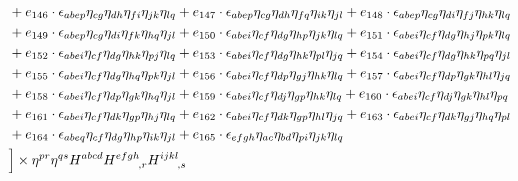 \begin{itemize}
{\begin{minipage}[t]{\linewidth}
\begin{align}
    & + e_{146} \cdot \epsilon_{a b e p} \eta_{c g} \eta_{d h} \eta_{f i} \eta_{j k} \eta_{l q} + e_{147} \cdot \epsilon_{a b e p} \eta_{c g} \eta_{d h} \eta_{f q} \eta_{i k} \eta_{j l} + e_{148} \cdot \epsilon_{a b e p} \eta_{c g} \eta_{d i} \eta_{f j} \eta_{h k} \eta_{l q} \nonumber \\
    & + e_{149} \cdot \epsilon_{a b e p} \eta_{c g} \eta_{d i} \eta_{f k} \eta_{h q} \eta_{j l} + e_{150} \cdot \epsilon_{a b e i} \eta_{c f} \eta_{d g} \eta_{h p} \eta_{j k} \eta_{l q} + e_{151} \cdot \epsilon_{a b e i} \eta_{c f} \eta_{d g} \eta_{h j} \eta_{p k} \eta_{l q} \nonumber \\
    & + e_{152} \cdot \epsilon_{a b e i} \eta_{c f} \eta_{d g} \eta_{h k} \eta_{p j} \eta_{l q} + e_{153} \cdot \epsilon_{a b e i} \eta_{c f} \eta_{d g} \eta_{h k} \eta_{p l} \eta_{j q} + e_{154} \cdot \epsilon_{a b e i} \eta_{c f} \eta_{d g} \eta_{h k} \eta_{p q} \eta_{j l} \nonumber \\
    & + e_{155} \cdot \epsilon_{a b e i} \eta_{c f} \eta_{d g} \eta_{h q} \eta_{p k} \eta_{j l} + e_{156} \cdot \epsilon_{a b e i} \eta_{c f} \eta_{d p} \eta_{g j} \eta_{h k} \eta_{l q} + e_{157} \cdot \epsilon_{a b e i} \eta_{c f} \eta_{d p} \eta_{g k} \eta_{h l} \eta_{j q} \nonumber \\
    & + e_{158} \cdot \epsilon_{a b e i} \eta_{c f} \eta_{d p} \eta_{g k} \eta_{h q} \eta_{j l} + e_{159} \cdot \epsilon_{a b e i} \eta_{c f} \eta_{d j} \eta_{g p} \eta_{h k} \eta_{l q} + e_{160} \cdot \epsilon_{a b e i} \eta_{c f} \eta_{d j} \eta_{g k} \eta_{h l} \eta_{p q} \nonumber \\
    & + e_{161} \cdot \epsilon_{a b e i} \eta_{c f} \eta_{d k} \eta_{g p} \eta_{h j} \eta_{l q} + e_{162} \cdot \epsilon_{a b e i} \eta_{c f} \eta_{d k} \eta_{g p} \eta_{h l} \eta_{j q} + e_{163} \cdot \epsilon_{a b e i} \eta_{c f} \eta_{d k} \eta_{g j} \eta_{h q} \eta_{p l} \nonumber \\
    & + e_{164} \cdot \epsilon_{a b e q} \eta_{c f} \eta_{d g} \eta_{h p} \eta_{i k} \eta_{j l} + e_{165} \cdot \epsilon_{e f g h} \eta_{a c} \eta_{b d} \eta_{p i} \eta_{j k} \eta_{l q} \nonumber \\
    & \Big\rbrack \times \eta^{pr} \eta^{qs} H^{abcd} H^{efgh}_{\hphantom{efgh},r} H^{ijkl}_{\hphantom{ijkl},s}
\end{align}
\end{minipage}} \\
  \scalebox{0.8}{
    \begin{minipage}[t]{\linewidth}
\begin{align}\label{ansatz_ABCI}

\end{align}
\end{minipage}}
\end{itemize}

